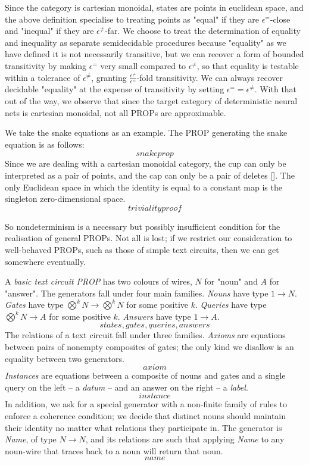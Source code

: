 Since the category is cartesian monoidal, states are points in euclidean space, and the above definition specialise to treating points as "equal" if they are $\epsilon^{=}$-close and "inequal" if they are $\epsilon^{\neq}$-far. We choose to treat the determination of equality and inequality as separate semidecidable procedures because "equality" as we have defined it is not necessarily transitive, but we can recover a form of bounded transitivity by making $\epsilon^{=}$ very small compared to $\epsilon^{\neq}$, so that equality is testable within a tolerance of $\epsilon^{\neq}$, granting $\frac{\epsilon^{\neq}}{\epsilon^{=}}$-fold transitivity. We can always recover decidable "equality" at the expense of transitivity by setting $\epsilon^{=} = \epsilon^{\neq}$. With that out of the way, we observe that since the target category of deterministic neural nets is cartesian monoidal, not all PROPs are approximable.

\begin{example}
We take the snake equations as an example. The PROP generating the snake equation is as follows:
\[snakeprop\]
Since we are dealing with a cartesian monoidal category, the cup can only be interpreted as a pair of points, and the cap can only be a pair of deletes []. The only Euclidean space in which the identity is equal to a constant map is the singleton zero-dimensional space.
\[triviality proof\]
\end{example}

So nondeterminism is a necessary but possibly insufficient condition for the realisation of general PROPs. Not all is lost; if we restrict our consideration to well-behaved PROPs, such as those of simple text circuits, then we can get somewhere eventually.

\begin{defn}
A \emph{basic text circuit PROP} has two colours of wires, $N$ for "noun" and $A$ for "answer". The generators fall under four main families. \emph{Nouns} have type $1 \rightarrow N$. \emph{Gates} have type $\bigotimes^k N \rightarrow \bigotimes^k N$ for some positive $k$. \emph{Queries} have type $\bigotimes^k N \rightarrow A$ for some positive $k$. \emph{Answers} have type $1 \rightarrow A$.
\[states, gates, queries, answers\]
The relations of a text circuit fall under three families. \emph{Axioms} are equations between pairs of nonempty composites of gates; the only kind we disallow is an equality between two generators.
\[axiom\]
\emph{Instances} are equations between a composite of nouns and gates and a single query on the left -- a \emph{datum} -- and an answer on the right -- a \emph{label}.
\[instance\]
In addition, we ask for a special generator with a non-finite family of rules to enforce a coherence condition; we decide that distinct nouns should maintain their identity no matter what relations they participate in. The generator is \emph{Name}, of type $N \rightarrow N$, and its relations are such that applying \emph{Name} to any noun-wire that traces back to a noun will return that noun.
\[name\]
\end{defn}

